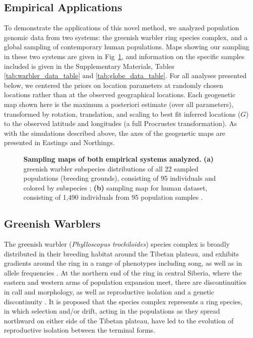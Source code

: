 \documentclass[10pt,letterpaper]{article}
\begin{document}
\subsection*{Empirical Applications}
To demonstrate the applications of this novel method, we analyzed population genomic data from two systems: the greenish warbler ring species complex, and a global sampling of contemporary human populations.  Maps showing our sampling in these two systems are given in Fig\ \ref{sfig:empirical_maps}, and information on the specific samples included is given in the Supplementary Materials, Tables \ref{tab:warbler_data_table} and \ref{tab:globe_data_table}.  
For all analyses presented below, 
we centered the priors on location parameters at randomly chosen locations
rather than at the observed geographical locations.
Each geogenetic map shown here is the maximum a posteriori estimate (over all parameters),
transformed by rotation, translation, and scaling to best fit inferred locations ($G$)
to the observed latitude and longitudes (a full Procrustes transformation).
As with the simulations described above, the axes of the geogenetic maps are presented
in Eastings and Northings.
%
\begin{figure}[ht!]
\begin{center}
\end{center}
\caption{
\textbf{Sampling maps of both empirical systems analyzed.}  
	\textbf{(a)}
	greenish warbler subspecies distributions of all 22 sampled populations (breeding grounds), 
	consisting of 95 individuals and colored by subspecies \cite{alcaide2014genomic}; 
	\textbf{(b)}
	sampling map for human dataset, consisting of 1,490 individuals from 95 population samples \cite{Hellenthal}.
}\label{sfig:empirical_maps}
\end{figure}

\subsection*{Greenish Warblers}  

The greenish warbler (\textit{Phylloscopus trochiloides}) species complex is broadly distributed in their breeding habitat
around the Tibetan plateau, and exhibits gradients around the ring in a range of phenotypes including song, as well as in allele frequencies \cite{ticehurst1938, Irwin2001, Irwin2005}.  At the northern end of the ring in central Siberia, where the eastern and western arms of population expansion meet, there are discontinuities in call and morphology, as well as reproductive isolation and a genetic discontinuity \cite{Irwin2001, Irwin2008}. It is proposed that the species complex represents a ring species, in which selection and/or drift, acting in the populations as they spread northward on either side of the Tibetan plateau, have led to the evolution of reproductive isolation between the terminal forms.
\end{document}
